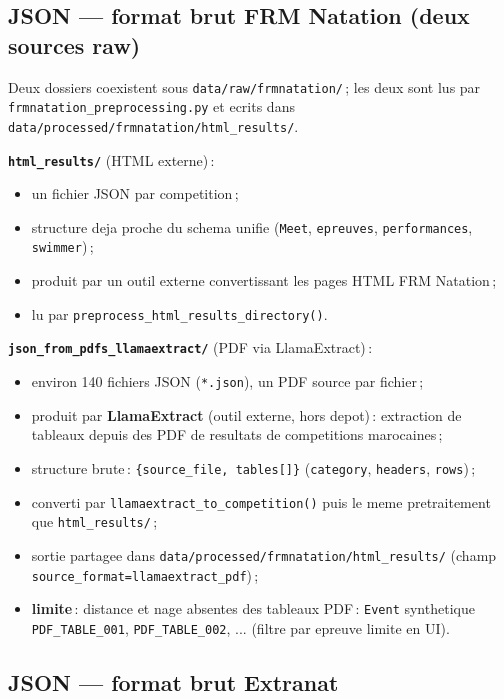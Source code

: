 \documentclass[11pt,a4paper]{article}
\begin{document}
\subsection{JSON --- format brut FRM Natation (deux sources raw)}

Deux dossiers coexistent sous \texttt{data/raw/frmnatation/}\,; les deux sont lus par \texttt{frmnatation\_preprocessing.py} et ecrits dans \texttt{data/processed/frmnatation/html\_results/}.

\textbf{\texttt{html\_results/}} (HTML externe)\,:
\begin{itemize}
  \item un fichier JSON par competition\,;
  \item structure deja proche du schema unifie (\texttt{Meet}, \texttt{epreuves}, \texttt{performances}, \texttt{swimmer})\,;
  \item produit par un outil externe convertissant les pages HTML FRM Natation\,;
  \item lu par \texttt{preprocess\_html\_results\_directory()}.
\end{itemize}

\textbf{\texttt{json\_from\_pdfs\_llamaextract/}} (PDF via LlamaExtract)\,:
\begin{itemize}
  \item environ 140 fichiers JSON (\texttt{*.json}), un PDF source par fichier\,;
  \item produit par \textbf{LlamaExtract} (outil externe, hors depot)\,: extraction de tableaux depuis des PDF de resultats de competitions marocaines\,;
  \item structure brute\,: \texttt{\{source\_file, tables[]\}} (\texttt{category}, \texttt{headers}, \texttt{rows})\,;
  \item converti par \texttt{llamaextract\_to\_competition()} puis le meme pretraitement que \texttt{html\_results/}\,;
  \item sortie partagee dans \texttt{data/processed/frmnatation/html\_results/} (champ \texttt{source\_format=llamaextract\_pdf})\,;
  \item \textbf{limite}\,: distance et nage absentes des tableaux PDF\,: \texttt{Event} synthetique \texttt{PDF\_TABLE\_001}, \texttt{PDF\_TABLE\_002}, ... (filtre par epreuve limite en UI).
\end{itemize}

\subsection{JSON --- format brut Extranat}
\end{document}
